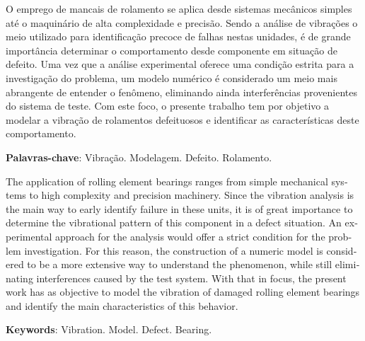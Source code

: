 \imprimircapa
\imprimirfolhaderosto
\clearpage


\begin{resumo}
	\SingleSpacing
	O emprego de mancais de rolamento se aplica desde sistemas mecânicos simples até o maquinário de alta complexidade e precisão.
	Sendo a análise de vibrações o meio utilizado para identificação precoce de falhas nestas unidades, é de grande importância determinar o comportamento desde componente em situação de defeito.
	Uma vez que a análise experimental oferece uma condição estrita para a investigação do problema, um modelo numérico é considerado um meio mais abrangente de entender o fenômeno, eliminando ainda interferências provenientes do sistema de teste.
	Com este foco, o presente trabalho tem por objetivo a modelar a vibração de rolamentos defeituosos e identificar as características deste comportamento.
	\vspace{\onelineskip}
	
	\noindent
	\textbf{Palavras-chave}: Vibração. Modelagem. Defeito. Rolamento.
\end{resumo}


\begin{resumo}
	\SingleSpacing
	\begin{otherlanguage}{english}
		The application of rolling element bearings ranges from simple mechanical systems to high complexity and precision machinery.
		Since the vibration analysis is the main way to early identify failure in these units, it is of great importance to determine the vibrational pattern of this component in a defect situation.
		An experimental approach for the analysis would offer a strict condition for the problem investigation.
		For this reason, the construction of a numeric model is considered to be a more extensive way to understand the phenomenon, while still eliminating interferences caused by the test system.
		With that in focus, the present work has as objective to model the vibration of damaged rolling element bearings and identify the main characteristics of this behavior.
		\vspace{\onelineskip}
		
		\noindent
		\textbf{Keywords}: Vibration. Model. Defect. Bearing.
	\end{otherlanguage}
\end{resumo}
\listoffigures*
\cleardoublepage

\listofquadros*
\cleardoublepage

\listoftables*
\cleardoublepage

\listofsiglas*
\cleardoublepage

\listofsimbolos*
\cleardoublepage

\tableofcontents*
\cleardoublepage
